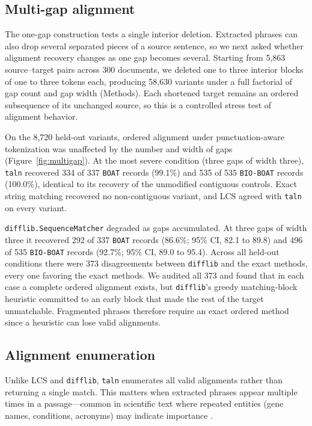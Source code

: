 \documentclass[pdflatex,lineno,referee,sn-vancouver-num]{sn-jnl}
\theoremstyle{thmstyleone}
\theoremstyle{thmstylethree}
\theoremstyle{thmstyletwo}
\begin{document}
\subsection{Multi-gap alignment}
The one-gap construction tests a single interior deletion. Extracted phrases can also drop several separated pieces of a source sentence, so we next asked whether alignment recovery changes as one gap becomes several. Starting from 5,863 source--target pairs across 300 documents, we deleted one to three interior blocks of one to three tokens each, producing 58,630 variants under a full factorial of gap count and gap width (Methods). Each shortened target remains an ordered subsequence of its unchanged source, so this is a controlled stress test of alignment behavior.

On the 8,720 held-out variants, ordered alignment under punctuation-aware tokenization was unaffected by the number and width of gaps (Figure~\ref{fig:multigap}). At the most severe condition (three gaps of width three), \texttt{taln} recovered 334 of 337 \texttt{BOAT} records (99.1\%) and 535 of 535 \texttt{BIO-BOAT} records (100.0\%), identical to its recovery of the unmodified contiguous controls. Exact string matching recovered no non-contiguous variant, and LCS agreed with \texttt{taln} on every variant.

\texttt{difflib.SequenceMatcher} degraded as gaps accumulated. At three gaps of width three it recovered 292 of 337 \texttt{BOAT} records (86.6\%; 95\% CI, 82.1 to 89.8) and 496 of 535 \texttt{BIO-BOAT} records (92.7\%; 95\% CI, 89.0 to 95.4). Across all held-out conditions there were 373 disagreements between \texttt{difflib} and the exact methods, every one favoring the exact methods. We audited all 373 and found that in each case a complete ordered alignment exists, but \texttt{difflib}'s greedy matching-block heuristic committed to an early block that made the rest of the target unmatchable. Fragmented phrases therefore require an exact ordered method since a heuristic can lose valid alignments.

\subsection{Alignment enumeration}
Unlike LCS and \texttt{difflib}, \texttt{taln} enumerates all valid alignments rather than returning a single match. This matters when extracted phrases appear multiple times in a passage---common in scientific text where repeated entities (gene names, conditions, acronyms) may indicate importance \citep{swayamdipta2018multimention, zhang2023howmanyanswers, moon2023extractive, wang2024mesaqa}.
\end{document}
